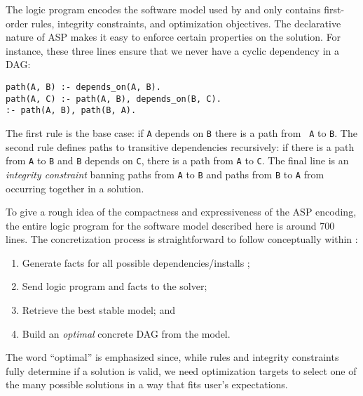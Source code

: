 The logic program encodes the software model used by \spack{} and only contains
first-order rules, integrity constraints, and optimization objectives. The declarative
nature of ASP makes it easy to enforce certain properties on the solution. For
instance, these three lines ensure that we never have a cyclic dependency in a DAG:
%
\begin{verbatim}
path(A, B) :- depends_on(A, B).
path(A, C) :- path(A, B), depends_on(B, C).
:- path(A, B), path(B, A).
\end{verbatim}
%
The first rule is the base case: if {\tt A} depends on {\tt B} there is a path from {\tt
  A} to {\tt B}. The second rule defines paths to transitive dependencies recursively:
if there is a path from {\tt A} to {\tt B} and {\tt B} depends on {\tt C}, there is a
path from {\tt A} to {\tt C}. The final line is an \emph{integrity constraint} banning
paths from {\tt A} to {\tt B} and paths from {\tt B} to {\tt A} from occurring together
in a solution.

To give a rough idea of the compactness and expressiveness of the ASP encoding, the
entire logic program for the software model described here is around $700$ lines. The
concretization process is straightforward to follow conceptually within \spack:
\begin{enumerate}
\item Generate facts for all possible dependencies/installs \footnotemark;
\item Send logic program and facts to the solver;
\item Retrieve the best stable model; and
\item Build an {\it optimal} concrete DAG from the model.
\end{enumerate}
 The word ``optimal'' is
emphasized since, while rules and integrity constraints fully determine if a solution is
valid, we need optimization targets to select one of the many possible solutions in a
way that fits user's expectations.

